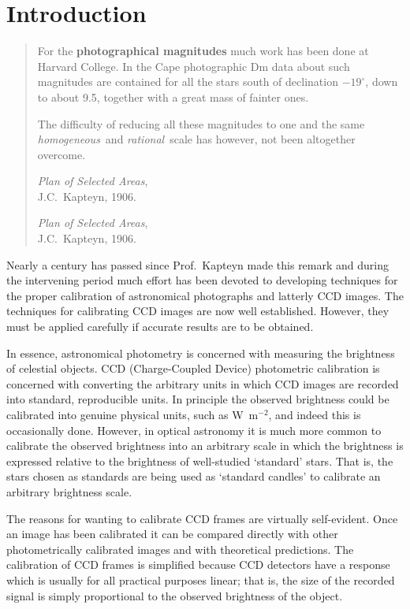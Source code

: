 \documentclass[twoside,11pt]{article}
\newenvironment{latexonly}{}{}
\newcommand{\xlabel}[1]{}
\begin{document}
\section{\xlabel{INTRO}\label{INTRO}Introduction}

\begin{quote}
For the {\bf photographical magnitudes} much work has been done at
Harvard College.  In the Cape photographic Dm data about such magnitudes
are contained for all the stars south of declination $-19^{\circ}$,
down to about 9.5, together with a great mass of fainter ones.

The difficulty of reducing all these magnitudes to one and the same
{\it homogeneous}\, and {\it rational}\, scale has however, not been
altogether overcome. 

\begin{latexonly}
{\it Plan of Selected Areas},    \raggedleft \\
J.C.~Kapteyn, 1906.              \raggedleft
\end{latexonly}
\begin{htmlonly}
{\it Plan of Selected Areas}, \\
J.C.~Kapteyn, 1906.
\end{htmlonly}
\end{quote}

Nearly a century has passed since Prof.~Kapteyn made this remark and
during the intervening period much effort has been devoted to
developing techniques for the proper calibration of astronomical
photographs and latterly CCD images.  The techniques for calibrating
CCD images are now well established.  However, they must be applied
carefully if accurate results are to be obtained.

In essence, astronomical photometry is concerned with measuring the
brightness of celestial objects.  CCD (Charge-Coupled Device) photometric
calibration is concerned with converting the arbitrary units in which CCD
images are recorded into standard, reproducible units.  In principle the
observed brightness could be calibrated into genuine physical units,
such as W~m$^{-2}$, and indeed this is occasionally done.  However, in
optical astronomy it is much more common to calibrate the observed
brightness into an arbitrary scale in which the brightness is
expressed relative to the brightness of well-studied `standard' stars.
That is, the stars chosen as standards are being used as `standard
candles' to calibrate an arbitrary brightness scale.

The reasons for wanting to calibrate CCD frames are virtually
self-evident.  Once an image has been calibrated it can be compared
directly with other photometrically calibrated images and with theoretical
predictions.  The calibration of CCD frames is simplified because CCD
detectors have a response which is usually for all practical purposes
linear; that is, the size of the recorded signal is simply proportional
to the observed brightness of the object.
\end{document}
